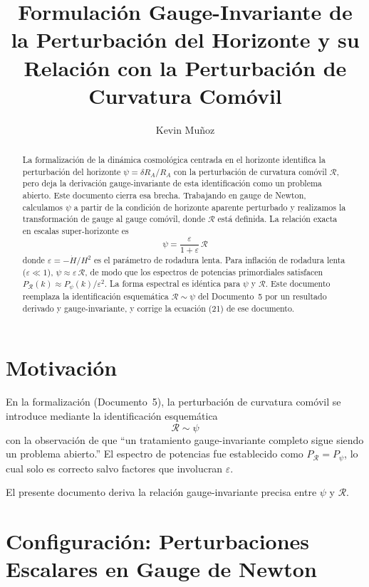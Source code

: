 \documentclass[12pt,a4paper]{article}
\title{Formulaci\'on Gauge-Invariante de la Perturbaci\'on del Horizonte y su Relaci\'on con la Perturbaci\'on de Curvatura Com\'ovil}
\author{Kevin Mu\~noz}
\date{}
\begin{document}
\maketitle

\begin{abstract}
La formalización de la dinámica cosmológica centrada en el horizonte identifica la perturbación del horizonte $\psi = \delta R_A / R_A$ con la perturbación de curvatura comóvil $\mathcal{R}$, pero deja la derivación gauge-invariante de esta identificación como un problema abierto. Este documento cierra esa brecha. Trabajando en gauge de Newton, calculamos $\psi$ a partir de la condición de horizonte aparente perturbado y realizamos la transformación de gauge al gauge comóvil, donde $\mathcal{R}$ está definida. La relación exacta en escalas super-horizonte es
\[
\psi = \frac{\varepsilon}{1 + \varepsilon}\,\mathcal{R}
\]
donde $\varepsilon = -\dot{H}/H^2$ es el parámetro de rodadura lenta. Para inflación de rodadura lenta ($\varepsilon \ll 1$), $\psi \approx \varepsilon\,\mathcal{R}$, de modo que los espectros de potencias primordiales satisfacen $P_\mathcal{R}(k) \approx P_\psi(k)/\varepsilon^2$. La forma espectral es idéntica para $\psi$ y $\mathcal{R}$. Este documento reemplaza la identificación esquemática $\mathcal{R} \sim \psi$ del Documento~5 por un resultado derivado y gauge-invariante, y corrige la ecuación (21) de ese documento.
\end{abstract}

\section{Motivación}

En la formalización (Documento~5), la perturbación de curvatura comóvil se introduce mediante la identificación esquemática
\begin{equation}
\mathcal{R} \sim \psi \tag{1}
\end{equation}
con la observación de que ``un tratamiento gauge-invariante completo sigue siendo un problema abierto.'' El espectro de potencias fue establecido como $P_\mathcal{R} = P_\psi$, lo cual solo es correcto salvo factores que involucran $\varepsilon$.

El presente documento deriva la relación gauge-invariante precisa entre $\psi$ y $\mathcal{R}$.

\section{Configuración: Perturbaciones Escalares en Gauge de Newton}
\end{document}
